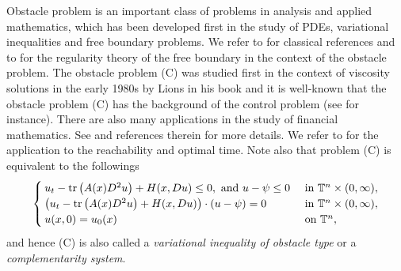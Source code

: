 \documentclass[12pt,reqno]{amsart}
\theoremstyle{plain}
\theoremstyle{remark}
\numberwithin{equation}{section}
\begin{document}
Obstacle problem is an important class of problems in analysis and applied mathematics,
which has been developed first in the study of PDEs, variational inequalities and free boundary problems. 
We refer to \cite{KS, F} for classical references and 
to \cite{C} for the regularity theory of the free boundary in the context 
of the obstacle problem. 
The obstacle problem (C) was studied first in the context of viscosity solutions 
in the early 1980s  by Lions in his book \cite{L} and 
it is well-known that the obstacle problem (C) has the background 
of the control problem (see \cite{B, BCD} for instance). 
There are also many applications in the study of financial mathematics. 
See \cite{P,FPP,B2,Hy} and references therein for more details. 
We refer to \cite{BFZ} for the application to the reachability and optimal time. 
Note also that problem (C) is equivalent to the followings
\begin{equation} \notag
\begin{cases}
u_t -{{\rm tr}\,}\big(A(x)D^2u\big) + H(x,Du)\le0, \ \text{and} \ u-\psi\le0 & \text{ in } {\mathbb{T}^{n}\times(0,\infty)}, \\
\big(u_t -{{\rm tr}\,}\big(A(x)D^2u\big) + H(x,Du)\big)\cdot (u-\psi)=0 & \text{ in } {\mathbb{T}^{n}\times(0,\infty)}, \\
u(x,0)=u_{0}(x) & \text{ on } {\mathbb{T}}^n,  
\end{cases}
\end{equation}
and hence (C) is also called a \textit{variational inequality of obstacle type} or 
a \textit{complementarity system}. 
\smallskip
\end{document}
